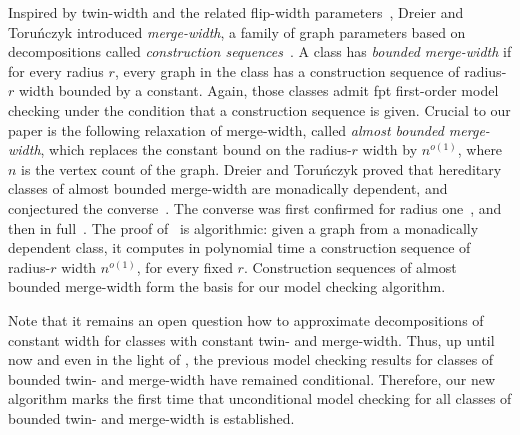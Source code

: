 Inspired by twin-width and the related flip-width parameters~\cite{flip-width},
Dreier and Toru\'nczyk introduced \emph{merge-width}, a family of graph parameters based on decompositions called \emph{construction sequences}~\cite{mw-stoc}. 
A class has \emph{bounded merge-width} if for every radius $r$, every graph in the class has a construction sequence of radius-$r$ width bounded by a constant.
Again, those classes admit fpt first-order model checking under the condition that a construction sequence is given.
Crucial to our paper is the following relaxation of merge-width, called \emph{almost bounded merge-width}, which replaces the constant bound on the radius-$r$ width by $n^{o(1)}$, where $n$ is the vertex count of the graph. 
Dreier and Toru\'nczyk proved that hereditary classes of almost bounded merge-width are monadically dependent, and conjectured the converse~\cite{mw-stoc}.
The converse was first confirmed for radius one~\cite{neighborhood-complexity-mw}, and then in full~\cite{md-abmw}.
The proof of~\cite{md-abmw} is algorithmic: given a graph from a monadically dependent class, it computes in polynomial time a construction sequence of radius-$r$ width $n^{o(1)}$, for every fixed $r$.
Construction sequences of almost bounded merge-width form the basis for our model checking algorithm.

Note that it remains an open question how to approximate decompositions of constant width for classes with constant twin- and merge-width.
Thus, up until now and even in the light of \cite{md-abmw}, the previous model checking results for classes of bounded twin- and merge-width have remained conditional.
Therefore, our new algorithm marks the first time that unconditional model checking for all classes of bounded twin- and merge-width is established.





